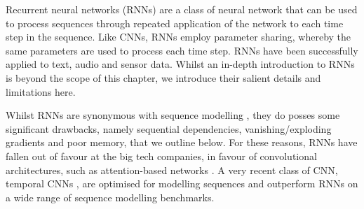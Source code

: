 Recurrent neural networks (RNNs) are a class of neural network that can be used to process sequences through repeated application of the network to each time step in the sequence. Like CNNs, RNNs employ parameter sharing, whereby the same parameters are used to process each time step. RNNs have been successfully applied to text, audio and sensor data. Whilst an in-depth introduction to RNNs is beyond the scope of this chapter, we introduce their salient details and limitations here.

Whilst RNNs are synonymous with sequence modelling \cite{Bai2018}, they do posses some significant drawbacks, namely sequential dependencies, vanishing/exploding gradients and poor memory, that we outline below. For these reasons, RNNs have fallen out of favour at the big tech companies, in favour of convolutional architectures, such as attention-based networks \cite{Xu2015,Elbayad2018}. A very recent class of CNN, temporal CNNs \cite{Bai2018}, are optimised for modelling sequences and outperform RNNs on a wide range of sequence modelling benchmarks.

